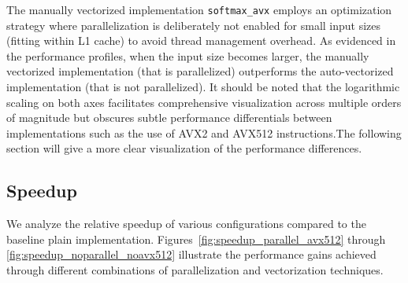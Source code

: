 \documentclass[10pt]{report}
\begin{document}
The manually vectorized implementation \texttt{softmax\_avx} employs an optimization strategy where parallelization is deliberately not enabled for small input sizes (fitting within L1 cache) to avoid thread management overhead. As evidenced in the performance profiles, when the input size becomes larger, the manually vectorized implementation (that is parallelized) outperforms the auto-vectorized implementation (that is not parallelized). It should be noted that the logarithmic scaling on both axes facilitates comprehensive visualization across multiple orders of magnitude but obscures subtle performance differentials between implementations such as the use of AVX2 and AVX512 instructions.The following section will give a more clear visualization of the performance differences.

\subsection*{Speedup}
We analyze the relative speedup of various configurations compared to the baseline plain implementation. Figures~\ref{fig:speedup_parallel_avx512} through \ref{fig:speedup_noparallel_noavx512} illustrate the performance gains achieved through different combinations of parallelization and vectorization techniques.
\end{document}

